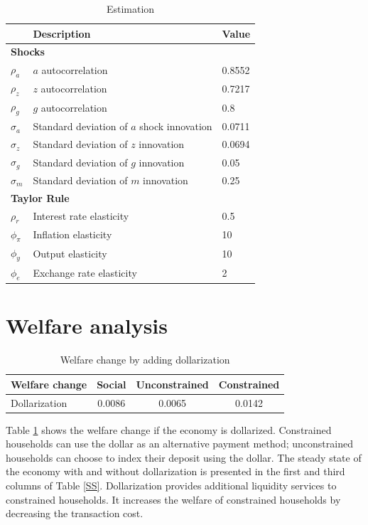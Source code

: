 \documentclass[12pt]{article}
\begin{document}
\begin{table}[h!]
\centering
\begin{tabular}{lll}
\hline\hline
& Description & Value \\\hline
\multicolumn{3}{l}{\bf Shocks}     \\                                                              
$\rho_a$      & $a$ autocorrelation    & 0.8552            \\
$\rho_z$       & $z$ autocorrelation     & 0.7217   	    \\
$\rho_g$     & $g$ autocorrelation & 0.8 \\
$\sigma_a$     & Standard deviation of $a$ shock innovation        & 0.0711   \\
$\sigma_z$     & Standard deviation of $z$ innovation   & 0.0694      \\
$\sigma_g$     &  Standard deviation of $g$  innovation & 0.05 \\
$\sigma_m$     & Standard deviation of $m$ innovation   & 0.25              \\
\multicolumn{3}{l}{\bf Taylor Rule}     \\ 
$\rho_r$     & Interest rate elasticity    & 0.5      	 \\
$\phi_{\pi}$    & Inflation elasticity       & 10       	\\
$\phi_y$       & Output elasticity           & 10     	\\
$\phi_e$       & Exchange rate elasticity          & 2      	\\\hline
\end{tabular}
\caption{Estimation}
\end{table}

\clearpage
\section{Welfare analysis}
\begin{table}[h!]
\centering
\begin{tabular}{lccc}
\hline\hline
Welfare change & Social  & Unconstrained & Constrained  \\\hline
Dollarization & 0.0086 &   0.0065  &  0.0142 \\\hline        
\end{tabular}
\caption{Welfare change by adding dollarization}
\label{Welfare1}
\end{table}
Table \ref{Welfare1} shows the welfare change if the economy is dollarized. Constrained households can use the dollar as an alternative payment method; unconstrained households can choose to index their deposit using the dollar. The steady state of the economy with and without dollarization is presented in the first and third columns of Table \ref{SS}. Dollarization provides additional liquidity services to constrained households. It increases the welfare of constrained households by decreasing the transaction cost. 
\end{document}
